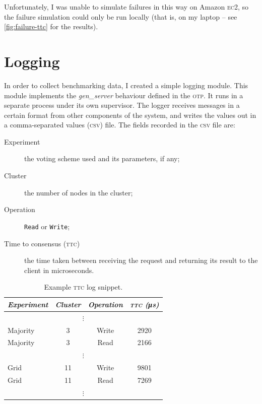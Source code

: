 \documentclass[12pt,chapterprefix=true,toc=bibliography,numbers=noendperiod,
               footnotes=multiple,twoside]{scrreprt}
\newcommand{\ECC}[0]{\textsc{ec}2}
\begin{document}
Unfortunately, I was unable to simulate failures in this way on Amazon \ECC, so the failure simulation could only be run locally (that is, on my laptop -- see \cref{fig:failure-ttc} for the results).

\section{Logging}
\label{sc:logging}

In order to collect benchmarking data, I created a simple logging module. This module implements the \emph{gen\_server} behaviour defined in the \textsc{otp}. It runs in a separate process under its own supervisor. The logger receives messages in a certain format from other components of the system, and writes the values out in a comma-separated values (\textsc{csv}) file. The fields recorded in the \textsc{csv} file are:

\begin{description}
    \item[Experiment] the voting scheme used and its parameters, if any;
    \item[Cluster] the number of nodes in the cluster;
    \item[Operation] \texttt{Read} or \texttt{Write};
    \item[Time to consensus (\textsc{ttc})] the time taken between receiving the request and returning its result to the client in microseconds.
\end{description}

\begin{table}[h]
    \centering
    \begin{tabular}{l c c c}
        \toprule
        \textit{Experiment} & \textit{Cluster} & \textit{Operation} & \textit{\textsc{ttc} (\si{\micro\second})} \\
        \midrule
        \multicolumn{4}{c}{\(\vdots\)} \\
        Majority & 3 & Write & 2920 \\
        Majority & 3 & Read & 2166 \\
        \multicolumn{4}{c}{\(\vdots\)} \\
        Grid & 11 & Write & 9801 \\
        Grid & 11 & Read & 7269 \\
        \multicolumn{4}{c}{\(\vdots\)} \\
        \bottomrule
    \end{tabular}
    \caption[Example TTC log snippet]{Example \textsc{ttc} log snippet.}
    \label{tab:csv}
\end{table}
\end{document}
